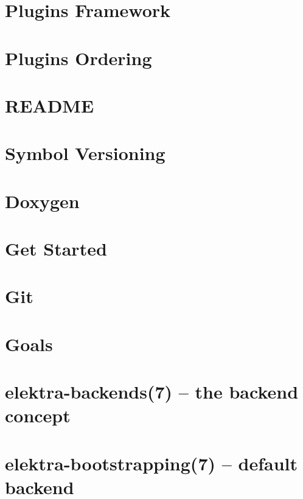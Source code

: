 \let\mypdfximage\pdfximage\def\pdfximage{\immediate\mypdfximage}\documentclass[twoside]{book}
\newcommand{\+}{\discretionary{\mbox{\scriptsize$\hookleftarrow$}}{}{}}
\begin{document}
\chapter{Plugins Framework}
\label{doc_dev_plugins-framework_md}

\chapter{Plugins Ordering}
\label{doc_dev_plugins-ordering_md}

\chapter{README}
\label{md_doc_dev_README}

\chapter{Symbol Versioning}
\label{doc_dev_symbol-versioning_md}

\chapter{Doxygen}
\label{doc_doxygen_README_md}

\chapter{Get Started}
\label{doc_GETSTARTED_md}

\chapter{Git}
\label{doc_Git_md}

\chapter{Goals}
\label{doc_GOALS_md}

\chapter{elektra-\/backends(7) -- the backend concept}
\label{doc_help_elektra-backends_md}

\chapter{elektra-\/bootstrapping(7) -- default backend}
\label{doc_help_elektra-bootstrapping_md}

\end{document}
